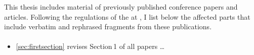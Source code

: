 
\label{ch:PreviousPublications}

This thesis includes material of previously published conference papers and articles. Following the regulations of the \myFaculty at \myUni, I list below the affected parts that include verbatim and rephrased fragments from these publications.

\sloppy

\paragraph{}
\begin{itemize}
    \item \cref{sec:firstsection} revises Section\,1 of all papers \dots
\end{itemize}

\fussy

\label{ch:PreviousPublicationsEnd}
